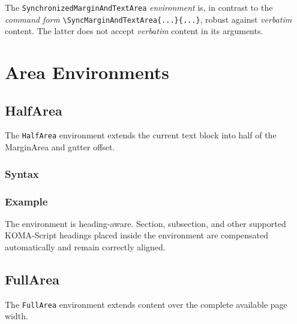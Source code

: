 \documentclass[
11pt,
a4paper,
oneside
]{scrbook}
\begin{document}
\begin{note}
	The \texttt{SynchronizedMarginAndTextArea} \emph{environment} is, in contrast to
	the \emph{command form} \verb|\SyncMarginAndTextArea{...}{...}|, robust against
	\emph{verbatim} content.
	The latter does not accept \emph{verbatim} content in its arguments.
\end{note}


\chapter{Area Environments}
\label{chap:area-environments}

\section{HalfArea}

The \texttt{HalfArea} environment extends the current text block into half
of the MarginArea and gutter offset.

\subsection{Syntax}






\subsection{Example}

\begin{HalfArea}




\end{HalfArea}
The environment is heading-aware.
Section, subsection, and other supported KOMA-Script headings placed inside
the environment are compensated automatically and remain correctly aligned.

\section{FullArea}

The \texttt{FullArea} environment extends content over the complete available
page width.
\end{document}

